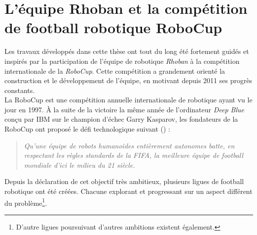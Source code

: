 
\section{L'équipe Rhoban et la compétition de football robotique RoboCup}

Les travaux développés dans cette thèse ont tout du long été
fortement guidés et inspirés par la participation 
de l'équipe de robotique \textit{Rhoban} à la compétition 
internationale de la \textit{RoboCup}.
Cette compétition a grandement orienté la construction et le
développement de l'équipe, en motivant depuis 2011 ses progrès constants.\\

La RoboCup est une compétition annuelle internationale
de robotique ayant vu le jour en 1997.
À la suite de la victoire la même année de l'ordinateur \textit{Deep Blue} conçu
par IBM sur le champion d'échec Garry Kasparov, 
les fondateurs de la RoboCup ont proposé le défi technologique 
suivant (\cite{kitano_robocup_1998}) : 
\begin{quote}
\textit{
Qu'une équipe de robots humanoïdes entièrement autonomes batte, en respectant 
les règles standards de la FIFA, la meilleure équipe de football mondiale
d'ici le milieu du 21 siècle.
}
\end{quote}
Depuis la déclaration de cet objectif très ambitieux, 
plusieurs ligues de football robotique ont été créées. 
Chacune explorant et progressant sur un aspect différent 
du problème\footnote{D'autre ligues poursuivant d'autres 
ambitions existent également.}.

